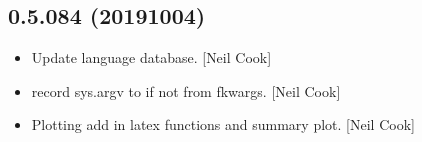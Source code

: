 \documentclass[a4paper,10pt,english]{report}
\begin{document}
\subsection{0.5.084 (2019\sphinxhyphen{}10\sphinxhyphen{}04)}
\label{\detokenize{misc/changelog:id77}}\begin{itemize}
\item {} 
Update language database. {[}Neil Cook{]}

\item {} 
 \sphinxhyphen{} record sys.argv to  if not
from fkwargs. {[}Neil Cook{]}

\item {} 
Plotting \sphinxhyphen{} add in latex functions and summary plot. {[}Neil Cook{]}

\end{itemize}
\end{document}
